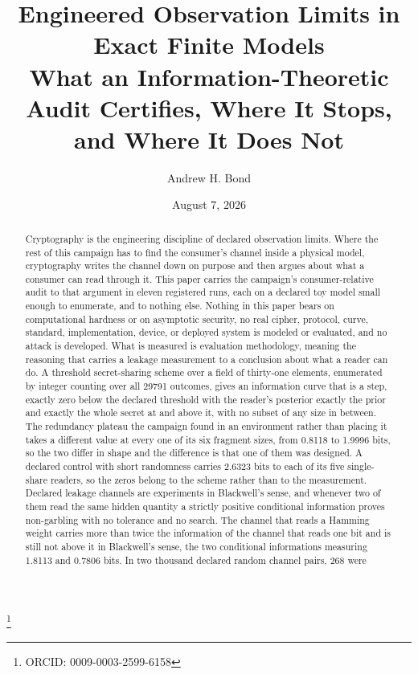 \documentclass[aps,pre,reprint,nofootinbib]{revtex4-2}
\begin{document}
\title{Engineered Observation Limits in Exact Finite Models\\
What an Information-Theoretic Audit Certifies, Where It Stops,
and Where It Does Not}

\author{Andrew H. Bond}
\thanks{ORCID: 0009-0003-2599-6158}
\date{August 7, 2026}

\begin{abstract}
Cryptography is the engineering discipline of declared observation
limits.  Where the rest of this campaign has to find the consumer's
channel inside a physical model, cryptography writes the channel down
on purpose and then argues about what a consumer can read through it.
This paper carries the campaign's consumer-relative audit to that
argument in eleven registered runs, each on a declared toy model
small enough to enumerate, and to nothing else.  Nothing
in this paper bears on computational hardness or on asymptotic
security, no real cipher, protocol, curve, standard, implementation,
device, or deployed system is modeled or evaluated, and no attack is
developed.  What is measured is
evaluation methodology, meaning the reasoning that carries a leakage
measurement to a conclusion about what a reader can do.  A threshold
secret-sharing scheme over a field of thirty-one elements, enumerated
by integer counting over all 29791 outcomes, gives an information
curve that is a step, exactly zero below the declared threshold with
the reader's posterior exactly the prior and exactly the whole secret
at and above it, with no subset of any size in between.  The
redundancy plateau the campaign found in an environment rather than
placing it takes a different value at every one of its six fragment
sizes, from 0.8118 to 1.9996 bits, so the two differ in shape and the
difference is that one of them was designed.  A declared control with
short randomness carries 2.6323
bits to each of its five single-share readers, so the zeros belong to
the scheme rather than to the measurement.
Declared leakage channels are experiments in
Blackwell's sense, and whenever two of them read the same hidden
quantity a strictly positive conditional information proves
non-garbling with no tolerance and no search.  The channel that reads
a Hamming weight carries more than twice the information of the
channel that reads one bit and is still not above it in Blackwell's
sense, the two conditional informations measuring 1.8113 and 0.7806
bits.  In two thousand declared random channel pairs, 268 were

\end{abstract}
\end{document}
